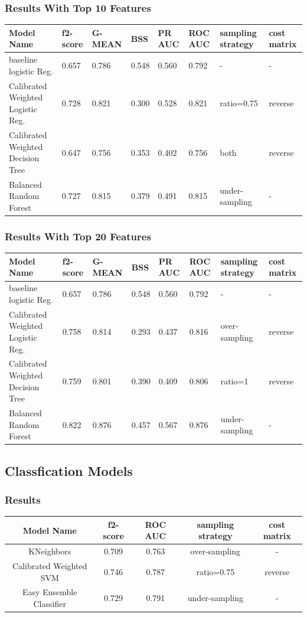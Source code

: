 \documentclass{article}
\begin{document}
 \subsubsection{Results With Top 10 Features}
\begin{tabular}{ |p{2cm}|p{1cm}|p{1cm}|p{1cm}|p{1cm}|p{1cm}|p{2cm}|p{2cm}|} 
 \hline
 Model Name&f2-score&G-MEAN&BSS&PR AUC&ROC AUC&sampling strategy& cost matrix\\ 
 \hline
baseline logistic Reg. &0.657 &0.786 &0.548 &0.560 &0.792&-&-\\
 \hline
Calibrated Weighted Logistic Reg. &0.728 &0.821 &0.300 &0.528 &0.821 &ratio=0.75& reverse\\
 \hline
Calibrated Weighted Decision Tree  &0.647 &0.756 &0.353 &0.402 &0.756&both&reverse\\
 \hline
Balanced Random Forest &0.727 &0.815 &0.379 &0.491 &0.815 &under-sampling&-\\
 \hline
\end{tabular}
 \subsubsection{Results With Top 20 Features}
\begin{tabular}{ |p{2cm}|p{1cm}|p{1cm}|p{1cm}|p{1cm}|p{1cm}|p{2cm}|p{2cm}|} 
 \hline
 Model Name&f2-score&G-MEAN&BSS&PR AUC&ROC AUC&sampling strategy& cost matrix\\ 
 \hline
baseline logistic Reg.&0.657 &0.786 &0.548 &0.560 &0.792&-&-\\
 \hline
Calibrated Weighted Logistic Reg. &0.758 &0.814 &0.293 &0.437 &0.816&over-sampling& reverse\\
 \hline
Calibrated Weighted Decision Tree&0.759 &0.801 &0.390 &0.409 &0.806&ratio=1&reverse\\
 \hline
Balanced Random Forest&0.822 &0.876 &0.457 &0.567 &0.876&under-sampling&-\\
 \hline
\end{tabular}

\subsection{Classfication Models}
 \subsubsection{Results}
\begin{tabular}{|c|c|c|c|c|} 
 \hline
 Model Name&f2-score&ROC AUC&sampling strategy& cost matrix\\ 
 \hline
KNeighbors &0.709 &0.763 & over-sampling & -\\
 \hline
Calibrated Weighted SVM &0.746 &0.787 &ratio=0.75&reverse\\
 \hline
Easy Ensemble Classifier &0.729 &0.791 &under-sampling&-\\ 
 \hline
\end{tabular}
\end{document}
